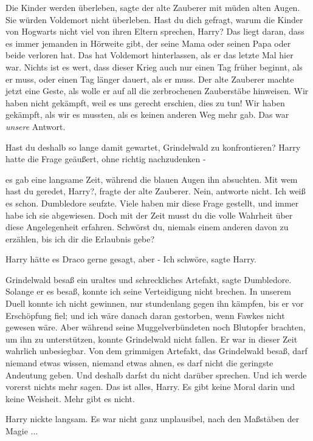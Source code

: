 \glqq{}Die Kinder werden überleben\grqq{}, sagte der alte Zauberer mit müden
alten Augen. \glqq{}Sie würden Voldemort nicht überleben. Hast du dich gefragt,
warum die Kinder von Hogwarts nicht viel von ihren Eltern sprechen, Harry? Das
liegt daran, dass es immer jemanden in Hörweite gibt, der seine Mama oder
seinen Papa oder beide verloren hat. Das hat Voldemort hinterlassen, als er das
letzte Mal hier war. Nichts ist es wert, dass dieser Krieg auch nur einen Tag
früher beginnt, als er muss, oder einen Tag länger dauert, als er muss.\grqq{}
Der alte Zauberer machte jetzt eine Geste, als wolle er auf all die zerbrochenen
Zauberstäbe hinweisen. \glqq{}Wir haben nicht gekämpft, weil es uns gerecht
erschien, dies zu tun! Wir haben gekämpft, als wir es mussten, als es keinen
anderen Weg mehr gab. Das war \emph{unsere} Antwort.\grqq{}

\glqq{}Hast du deshalb so lange damit gewartet, Grindelwald zu
konfrontieren?\grqq{} Harry hatte die Frage geäußert, ohne richtig nachzudenken
-

es gab eine langsame Zeit, während die blauen Augen ihn absuchten. \glqq{}Mit wem
hast du geredet, Harry?\grqq{}, fragte der alte Zauberer. \glqq{}Nein, antworte
nicht. Ich weiß es schon.\grqq{} Dumbledore seufzte. \glqq{}Viele haben mir diese
Frage gestellt, und immer habe ich sie abgewiesen. Doch mit der Zeit musst du
die volle Wahrheit über diese Angelegenheit erfahren. Schwörst du, niemals einem
anderen davon zu erzählen, bis ich dir die Erlaubnis gebe?\grqq{}

Harry hätte es Draco gerne gesagt, aber - \glqq{}Ich schwöre\grqq{}, sagte Harry.

\glqq{}Grindelwald besaß ein uraltes und schreckliches Artefakt\grqq{}, sagte
Dumbledore. \glqq{}Solange er es besaß, konnte ich seine Verteidigung nicht
brechen. In unserem Duell konnte ich nicht gewinnen, nur stundenlang gegen ihn
kämpfen, bis er vor Erschöpfung fiel; und ich wäre danach daran gestorben, wenn
Fawkes nicht gewesen wäre. Aber während seine Muggelverbündeten noch Blutopfer
brachten, um ihn zu unterstützen, konnte Grindelwald nicht fallen. Er war in
dieser Zeit wahrlich unbesiegbar. Von dem grimmigen Artefakt, das Grindelwald
besaß, darf niemand etwas wissen, niemand etwas ahnen, es darf nicht die
geringste Andeutung geben. Und deshalb darfst du nicht darüber sprechen. Und ich
werde vorerst nichts mehr sagen. Das ist alles, Harry. Es gibt keine Moral darin
und keine Weisheit. Mehr gibt es nicht.\grqq{}

Harry nickte langsam. Es war nicht ganz unplausibel, nach den Maßstäben der
Magie ...

